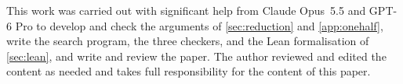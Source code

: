 This work was carried out with significant help from Claude Opus~5.5 and GPT-6 Pro to develop and check the arguments of \cref{sec:reduction} and \cref{app:onehalf}, write the search program, the three checkers, and the Lean formalisation of \cref{sec:lean}, and write and review the paper. The author reviewed and edited the content as needed and takes full responsibility for the content of this paper.
